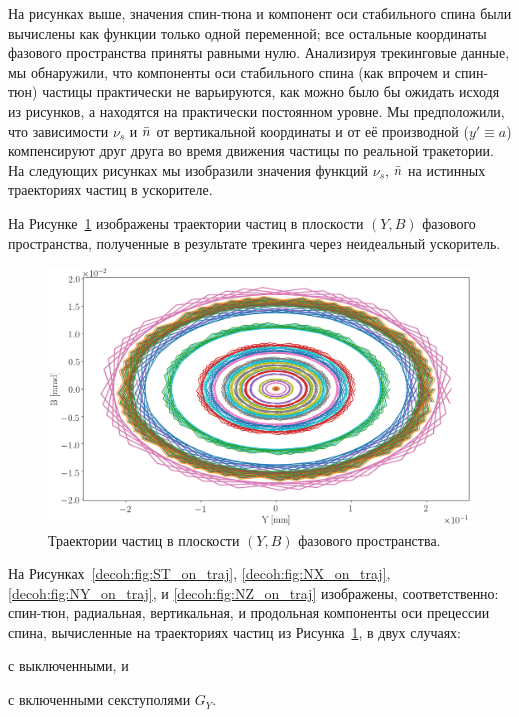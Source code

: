 На рисунках выше, значения спин-тюна и компонент оси стабильного спина были вычислены как функции только одной переменной; все остальные координаты фазового пространства приняты равными нулю. Анализируя трекинговые данные, мы обнаружили, что компоненты оси стабильного спина (как впрочем и спин-тюн) частицы практически не варьируются, как можно было бы ожидать исходя из рисунков, а находятся на практически постоянном уровне. Мы предположили, что зависимости $\nu_s$ и $\bar n$ от вертикальной координаты и от её производной ($y'\equiv a$) компенсируют друг друга во время движения частицы по реальной тракетории. На следующих рисунках мы изобразили значения функций $\nu_s$, $\bar n$ на истинных траекториях частиц в ускорителе.

На Рисунке~\ref{decoh:fig:yb_traj} изображены траектории частиц в плоскости $(Y,B)$ фазового пространства, полученные в результате трекинга через неидеальный ускоритель.
\begin{figure}[h!]
	\centering
	\includegraphics[width=\linewidth]{images/decoh_sim/YB-PHASE_SPACE_IMPERFECT_UNOPT}
	\caption{Траектории частиц в плоскости $(Y,B)$ фазового пространства.\label{decoh:fig:yb_traj}} 
\end{figure}

На Рисунках~\ref{decoh:fig:ST_on_traj}, \ref{decoh:fig:NX_on_traj}, \ref{decoh:fig:NY_on_traj}, и \ref{decoh:fig:NZ_on_traj} изображены, соответственно: спин-тюн, радиальная, вертикальная, и продольная компоненты оси прецессии спина, вычисленные на траекториях частиц из Рисунка~\ref{decoh:fig:yb_traj}, в двух случаях:
\begin{enumerate*}
	\item с выключенными, и 
	\item с включенными секступолями $G_Y$.
\end{enumerate*}  

